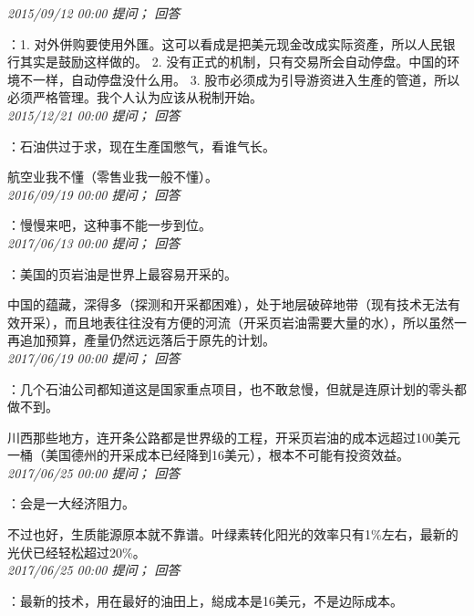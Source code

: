 \documentclass[twocolumn]{ctexart}
\begin{document}
\textit{\hfill\noindent\small 2015/09/12 00:00 提问； 回答}

：1. 对外併购要使用外匯。这可以看成是把美元现金改成实际资產，所以人民银行其实是鼓励这样做的。
2. 没有正式的机制，只有交易所会自动停盘。中国的环境不一样，自动停盘没什么用。
3. 股市必须成为引导游资进入生產的管道，所以必须严格管理。我个人认为应该从税制开始。\\

\textit{\hfill\noindent\small 2015/12/21 00:00 提问； 回答}

：石油供过于求，现在生產国憋气，看谁气长。

航空业我不懂（零售业我一般不懂）。\\

\textit{\hfill\noindent\small 2016/09/19 00:00 提问； 回答}

：慢慢来吧，这种事不能一步到位。\\

\textit{\hfill\noindent\small 2017/06/13 00:00 提问； 回答}

：美国的页岩油是世界上最容易开采的。

中国的蕴藏，深得多（探测和开采都困难），处于地层破碎地带（现有技术无法有效开采），而且地表往往没有方便的河流（开采页岩油需要大量的水），所以虽然一再追加预算，產量仍然远远落后于原先的计划。\\

\textit{\hfill\noindent\small 2017/06/19 00:00 提问； 回答}

：几个石油公司都知道这是国家重点项目，也不敢怠慢，但就是连原计划的零头都做不到。

川西那些地方，连开条公路都是世界级的工程，开采页岩油的成本远超过100美元一桶（美国德州的开采成本已经降到16美元），根本不可能有投资效益。\\

\textit{\hfill\noindent\small 2017/06/25 00:00 提问； 回答}

：会是一大经济阻力。

不过也好，生质能源原本就不靠谱。叶绿素转化阳光的效率只有1\%左右，最新的光伏已经轻松超过20\%。\\

\textit{\hfill\noindent\small 2017/06/25 00:00 提问； 回答}

：最新的技术，用在最好的油田上，縂成本是16美元，不是边际成本。\\
\end{document}
